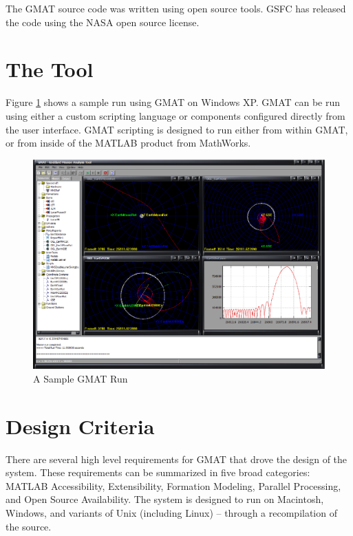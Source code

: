The GMAT source code was written using open source tools.  GSFC has released the code using the
NASA open source license.

\section{The Tool}

Figure \ref{DLS_Sample} shows a sample run using GMAT on Windows XP.  GMAT can be run using either a
custom scripting language or components configured directly from the user interface.  GMAT scripting
is designed to run either from within GMAT, or from inside of the MATLAB product from MathWorks.

\begin{figure}
\begin{center}
  \includegraphics[360,259]{Images/DoubleLunarSwingby.png}
  \caption{A Sample GMAT Run}\label{DLS_Sample}
\end{center}
\end{figure}

\section{Design Criteria}

There are several high level requirements for GMAT that drove the design of the system.  These
requirements can be summarized in five broad categories: MATLAB Accessibility, Extensibility,
Formation Modeling, Parallel Processing, and Open Source Availability.  The system is designed to
run on Macintosh, Windows, and variants of Unix (including Linux) -- through a recompilation of the
source.

